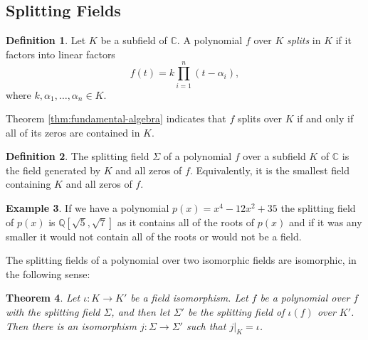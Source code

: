 \documentclass[12pt]{article}
\newtheorem{theorem}{Theorem}
\theoremstyle{definition}
\newtheorem{definition}[theorem]{Definition}
\newtheorem{example}[theorem]{Example}
\newcommand{\C}{\mathbb C}
\begin{document}
\subsection{Splitting Fields}
\begin{definition}
    Let $K$ be a subfield of $\C$. A polynomial $f$ over $K$ \textit{splits} in $K$ if it factors into linear factors $$
    f(t) = k \prod _{i=1} ^n (t - \alpha_i),
    $$
    where $k, \alpha_1, \ldots, \alpha_n \in K$. 
\end{definition}
Theorem \ref{thm:fundamental-algebra} indicates that $f$ splits over $K$ if and only if all of its zeros are contained in $K$. 

\begin{definition}
    The splitting field $\Sigma$ of a polynomial $f$ over a subfield $K$ of $\C$ is the field generated by $K$ and all zeros of $f$. Equivalently, it is the smallest field containing $K$ and all zeros of $f$. 
\end{definition}

\begin{example}
If we have a polynomial \(p(x) = x^4 - 12x^2 + 35\) the splitting field of \(p(x)\) is \(\mathbb{Q}[\sqrt{5},\sqrt{7}]\) as it contains all of the roots of \(p(x)\) and if it was any smaller it would not contain all of the roots or would not be a field.
\end{example}

The splitting fields of a polynomial over two isomorphic fields are isomorphic, in the following sense:

\begin{theorem} \label{thm:splitting-field-unique}
	Let $\iota: K \to K'$ be a field isomorphism. Let $f$ be a polynomial over $f$ with the splitting field $\Sigma$, and then let $\Sigma'$ be the splitting field of $\iota(f)$ over $K'$. Then there is an isomorphism $j : \Sigma \to \Sigma'$ such that $j | _K = \iota$. 
\end{theorem}
\end{document}
